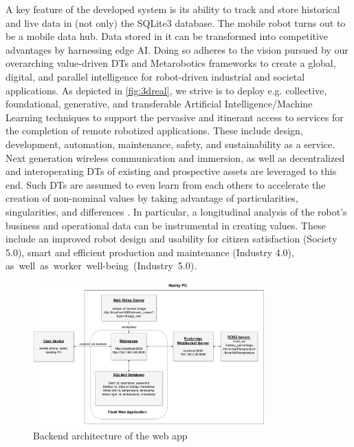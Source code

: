 \documentclass[conference]{IEEEtran}
\begin{document}
A key feature of the developed system is its ability to track and store historical and live data in (not only) the SQLite3 database. The mobile robot turns out to be a mobile data hub. Data stored in it can be transformed into competitive advantages by harnessing edge AI. Doing so adheres to the vision pursued by our overarching value-driven DTs \cite{kaigom2020value} and Metarobotics \cite{kaigom} frameworks to create a global, digital, and parallel  intelligence for robot-driven industrial and societal applications. As depicted in \cref{fig:3dreal}, we strive is to deploy e.g. collective, foundational, generative, and transferable Artificial Intelligence/Machine Learning techniques to support the pervasive and itinerant access to services for the completion of remote robotized applications. These include design, development, automation, maintenance, safety, and sustainability as a service. Next generation wireless communication and immersion, as well as decentralized and interoperating DTs of existing and prospective assets are leveraged to this end. Such DTs are assumed to even learn from each others to accelerate the creation of non-nominal values by taking advantage of particularities, singularities, and differences \cite{kaigom}. In particular, a longitudinal analysis of the robot's business and operational data can be instrumental in creating values. These include an improved robot design and usability for citizen satisfaction (Society 5.0),  smart and efficient production and maintenance (Industry 4.0), \mbox{as well as worker well-being (Industry 5.0).} %
\begin{figure}[t]
    \centerline{\includegraphics[width=8.9cm]{Pictures/userappbig.pdf}}
    \caption{Backend architecture of the web app}
    \label{fig:userapp}
\end{figure}
\end{document}
